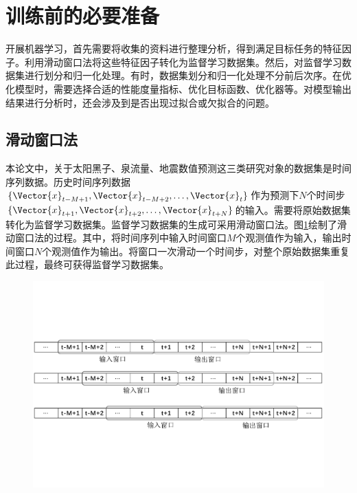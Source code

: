 \section{训练前的必要准备}\label{sec:ml_prepare}

开展机器学习，首先需要将收集的资料进行整理分析，得到满足目标任务的特征因子。利用滑动窗口法将这些特征因子转化为监督学习数据集。然后，对监督学习数据集进行划分和归一化处理。有时，数据集划分和归一化处理不分前后次序。在优化模型时，需要选择合适的性能度量指标、优化目标函数、优化器等。对模型输出结果进行分析时，还会涉及到是否出现过拟合或欠拟合的问题。

\subsection{滑动窗口法}\label{sec:ml_slide}

本论文中，关于太阳黑子、泉流量、地震数值预测这三类研究对象的数据集是时间序列数据。历史时间序列数据$\{\Vector{x}_{t-M+1},\Vector{x}_{t-M+2},\ldots,\Vector{x}_{t}\}$作为预测下$N$个时间步$\{\Vector{x}_{t+1},\Vector{x}_{t+2},\ldots,\Vector{x}_{t+N}\}$的输入。需要将原始数据集转化为监督学习数据集。监督学习数据集的生成可采用滑动窗口法。图\ref{fig:slide_window}绘制了滑动窗口法的过程。其中，将时间序列中输入时间窗口$M$个观测值作为输入，输出时间窗口$N$个观测值作为输出。将窗口一次滑动一个时间步，对整个原始数据集重复此过程，最终可获得监督学习数据集。

\begin{figure}[!htbp]
  \centering
  \includegraphics[width=\textwidth]{Img/chap2_ml/slide_window.pdf}
  \label{fig:slide_window}
\end{figure}


